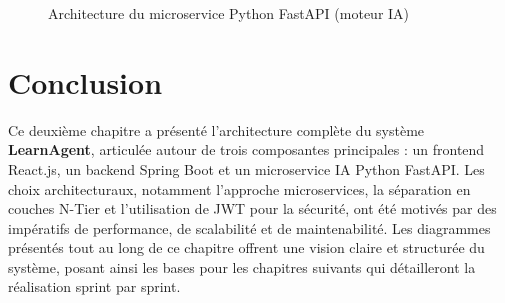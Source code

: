 \documentclass[12pt,a4paper]{report}
\begin{document}
\begin{figure}[H]
\centering
{}
\caption{Architecture du microservice Python FastAPI (moteur IA)}
\label{fig:ai_archi}
\end{figure}

\section*{Conclusion}

Ce deuxième chapitre a présenté l'architecture complète du système \textbf{LearnAgent}, articulée autour de trois composantes principales : un frontend React.js, un backend Spring Boot et un microservice IA Python FastAPI. Les choix architecturaux, notamment l'approche microservices, la séparation en couches N-Tier et l'utilisation de JWT pour la sécurité, ont été motivés par des impératifs de performance, de scalabilité et de maintenabilité. Les diagrammes présentés tout au long de ce chapitre offrent une vision claire et structurée du système, posant ainsi les bases pour les chapitres suivants qui détailleront la réalisation sprint par sprint.

\newpage

\end{document}
